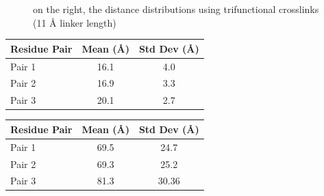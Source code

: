 \documentclass[a4paper,8pt]{beamer}
\begin{document}
\begin{frame}
\begin{figure}
{on the right, the distance distributions using trifunctional crosslinks (11 {\AA} linker length)}
\end{figure}
%
\begin{minipage}{0.48\textwidth}
  \centering
  \begin{tabular}{lcc}
  \hline
  Residue Pair & Mean (Å) & Std Dev (Å) \\
  \hline
  Pair 1 & 16.1 & 4.0 \\
  Pair 2 & 16.9 & 3.3 \\
  Pair 3 & 20.1 & 2.7 \\
  \hline
  \end{tabular}
  \end{minipage}
  \hfill
  \begin{minipage}{0.48\textwidth}
  \centering
  \begin{tabular}{lcc}
  \hline
  Residue Pair & Mean (Å) & Std Dev (Å) \\
  \hline
  Pair 1 & 69.5 & 24.7 \\
  Pair 2 & 69.3 & 25.2 \\
  Pair 3 & 81.3 & 30.36 \\
  \hline
  \end{tabular}
  \end{minipage}
\end{frame}
%
\end{document}
